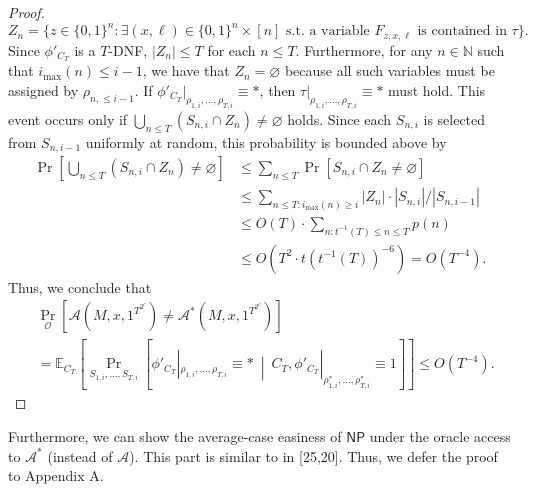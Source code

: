 \begin{proof}
\[Z_n=\{z\in\{0,1\}^n:\exists(x,\ell)\in\{0,1\}^n\times[n]\text{ s.t. a variable }F_{z,x,\ell}\text{ is contained in }\tau\}.\]
Since $\phi'_{C_T}$ is a $T$-DNF, $|Z_n|\leq T$ for each $n\leq T$. Furthermore, for any $n\in\mathbb N$ such that $i_{\max}(n)\leq i-1$, we have that $Z_n=\varnothing$ because all such variables must be assigned by $\rho_{n,\leq i-1}$. If $\phi'_{C_T}|_{\rho_{1,i},\ldots,\rho_{T,i}}\equiv*$, then $\tau|_{\rho_{1,i},\ldots,\rho_{T,i}}\equiv*$ must hold. This event occurs only if $\bigcup_{n\leq T}(S_{n,i}\cap Z_n)\neq\varnothing$ holds. Since each $S_{n,i}$ is selected from $S_{n,i-1}$ uniformly at random, this probability is bounded above by
\begin{align*}
\Pr\left[\bigcup_{n\leq T}(S_{n,i}\cap Z_n)\neq\varnothing\right]
&\leq\sum_{n\leq T}\Pr[S_{n,i}\cap Z_n\neq\varnothing]\\
&\leq\sum_{n\leq T:i_{\max}(n)\geq i}|Z_n|\cdot|S_{n,i}|/|S_{n,i-1}|\\
&\leq O(T)\cdot\sum_{n:t^{-1}(T)\leq n\leq T}p(n)\\
&\leq O(T^2\cdot t(t^{-1}(T))^{-6})=O(T^{-4}).
\end{align*}
Thus, we conclude that
\begin{align*}
&\Pr_{\mathcal O}[\mathcal A(M,x,1^{T^{2^c}})\neq\mathcal A^*(M,x,1^{T^{2^c}})]\\
&=\mathbb E_{C_T}\!\left[\Pr_{S_{1,i},\ldots,S_{T,i}}\!\left[\phi'_{C_T}|_{\rho_{1,i},\ldots,\rho_{T,i}}\equiv*\ \middle|\ C_T,\phi'_{C_T}|_{\rho^*_{1,i},\ldots,\rho^*_{T,i}}\equiv1\right]\right]\leq O(T^{-4}).
\end{align*}
\end{proof}
Furthermore, we can show the average-case easiness of $\mathsf{NP}$ under the oracle access to $\mathcal A^*$ (instead of $\mathcal A$). This part is similar to in [25,20]. Thus, we defer the proof to Appendix A.
